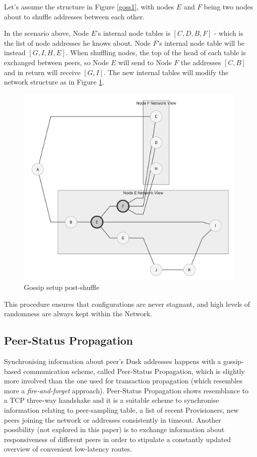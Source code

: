 Let's assume the structure in Figure \ref{goss1}, with nodes \(E\) and \(F\)
being two nodes about to shuffle addresses between each other.

In the scenario above, Node \(E\)'s internal node tables is
\([C, D, B, F]\) - which is the list of node addresses he knows about.
Node \(F\)'s internal node table will be instead \([G, I, H, E]\). When
shuffling nodes, the top of the head of each table is exchanged between
peers, so Node \(E\) will send to Node \(F\) the addresses \([C,B]\) and
in return will receive \([G,I]\). The new internal tables will modify
the network structure as in Figure \ref{goss2}.

\begin{figure}
\includegraphics[scale=0.25]{gossip2}
\caption{Gossip setup post-shuffle}
\label{goss2}
\end{figure}


This procedure ensures that configurations are never stagnant, and high
levels of randomness are always kept within the Network.


\subsection{Peer-Status Propagation}

Synchronising information about peer's \textrm{Dusk} addresses happens with a
gossip-based communication scheme, called Peer-Status Propagation, which
is slightly more involved than the one used for transaction propagation
(which resembles more a \emph{fire-and-forget} approach). Peer-Status
Propagation shows resemblance to a TCP three-way handshake and it is a
suitable scheme to synchronise information relating to peer-sampling
table, a list of recent Provisioners, new peers joining the network or
addresses consistently in timeout. Another possibility (not explored in
this paper) is to exchange information about responsiveness of different
peers in order to stipulate a constantly updated overview of convenient
low-latency routes.

